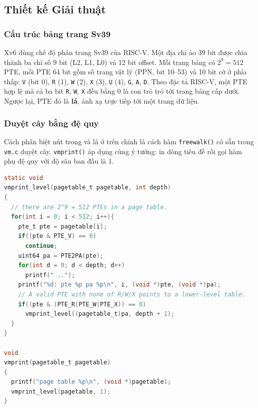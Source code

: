 \subsection{Thiết kế Giải thuật}

\subsubsection{Cấu trúc bảng trang Sv39}
Xv6 dùng chế độ phân trang Sv39 của RISC-V. Một địa chỉ ảo 39 bit được chia thành ba chỉ số 9 bit (L2, L1, L0) và 12 bit offset. Mỗi trang bảng có $2^9 = 512$ PTE, mỗi PTE 64 bit gồm số trang vật lý (PPN, bit 10--53) và 10 bit cờ ở phía thấp: \texttt{V} (bit 0), \texttt{R} (1), \texttt{W} (2), \texttt{X} (3), \texttt{U} (4), \texttt{G}, \texttt{A}, \texttt{D}. Theo đặc tả RISC-V, một PTE hợp lệ mà cả ba bit \texttt{R}, \texttt{W}, \texttt{X} đều bằng 0 là con trỏ trỏ tới trang bảng cấp dưới. Ngược lại, PTE đó là \textbf{lá}, ánh xạ trực tiếp tới một trang dữ liệu.

\subsubsection{Duyệt cây bằng đệ quy}
Cách phân biệt nút trong và lá ở trên chính là cách hàm \texttt{freewalk()} có sẵn trong \texttt{vm.c} duyệt cây. \texttt{vmprint()} áp dụng cùng ý tưởng: in dòng tiêu đề rồi gọi hàm phụ đệ quy với độ sâu ban đầu là 1.

\begin{lstlisting}[language=C, caption={Hàm vmprint() và hàm phụ vmprint\_level() trong kernel/vm.c}]
static void
vmprint_level(pagetable_t pagetable, int depth)
{
  // there are 2^9 = 512 PTEs in a page table.
  for(int i = 0; i < 512; i++){
    pte_t pte = pagetable[i];
    if((pte & PTE_V) == 0)
      continue;
    uint64 pa = PTE2PA(pte);
    for(int d = 0; d < depth; d++)
      printf(" ..");
    printf("%d: pte %p pa %p\n", i, (void *)pte, (void *)pa);
    // A valid PTE with none of R/W/X points to a lower-level table.
    if((pte & (PTE_R|PTE_W|PTE_X)) == 0)
      vmprint_level((pagetable_t)pa, depth + 1);
  }
}

void
vmprint(pagetable_t pagetable)
{
  printf("page table %p\n", (void *)pagetable);
  vmprint_level(pagetable, 1);
}
\end{lstlisting}

